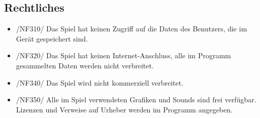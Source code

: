 \subsection{Rechtliches}
\begin{itemize}
\item /NF310/ Das Spiel hat keinen Zugriff auf die Daten des Benutzers, die im Gerät gespeichert sind.
\item /NF320/ Das Spiel hat keinen Internet-Anschluss, alle im Programm gesammelten Daten werden nicht verbreitet.
\item /NF340/ Das Spiel wird nicht kommerziell verbreitet.
\item /NF350/ Alle im Spiel verwendeten Grafiken und Sounds sind frei verfügbar. Lizenzen und Verweise auf Urheber werden im Programm angegeben.
\end{itemize}